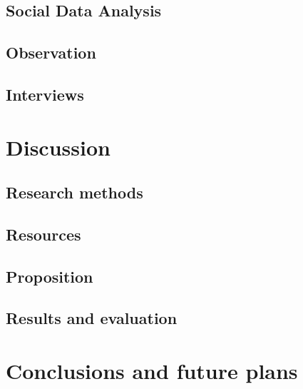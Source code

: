 \documentclass[english]{tktltiki}
\begin{document}

\subsection{Social Data Analysis}


\subsection{Observation}


\subsection{Interviews}


\section{Discussion}
\subsection{Research methods}

\subsection{Resources}



\subsection{Proposition}


\subsection{Results and evaluation}

\section{Conclusions and future plans}
\end{document}
